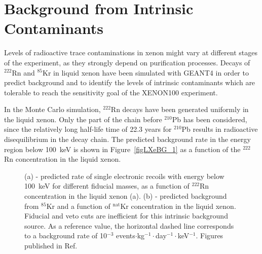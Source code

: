 \section{Background from Intrinsic Contaminants}
\label{secBackgroundIntrinsic}

Levels of radioactive trace contaminations in xenon might vary at different stages of the experiment, as they strongly depend on purification processes. 
Decays of $^{222}$Rn and $^{85}$Kr in liquid xenon have been simulated with GEANT4 in order to predict  background and to identify the levels of intrinsic contaminants which are tolerable to reach the sensitivity goal of the XENON100 experiment.

In the Monte Carlo simulation, $^{222}$Rn decays have been generated uniformly in the liquid xenon. Only the part of the chain before $^{210}$Pb has been considered, since the relatively long half-life time of 22.3 years for $^{210}$Pb results in radioactive disequilibrium in the decay chain.
The predicted background rate in the energy region below 100~keV is shown in Figure~\ref{figLXeBG_1} as a function of the $^{222}$Rn concentration in the liquid xenon.

\begin{figure}[!h]
\caption[Predicted rate of single electronic recoils with energy below 100~keV for different fiducial masses,  as a function of $^{222}$Rn and $^{\mathrm{nat}}$Kr concentration in the liquid xenon]{
(a) - predicted rate of single electronic recoils with energy below 100~keV for different fiducial masses,  as a function of $^{222}$Rn concentration in the liquid xenon (a).
(b) - predicted background from $^{85}$Kr and a function of $^{\mathrm{nat}}$Kr concentration in the liquid xenon. 
Fiducial and veto cuts are inefficient for this intrinsic background source. As a reference value, the horizontal dashed line corresponds to a background rate of 10$^{-3}$ events$\cdot$kg$^{-1}\cdot$day$^{-1}\cdot$keV$^{-1}$. 
Figures published in Ref.~\cite{EMBG}
}
\label{figLXeBG}
\end{figure}

